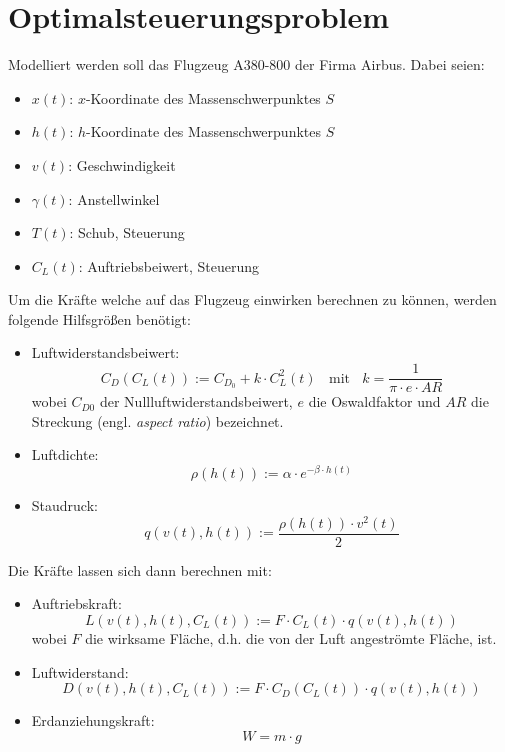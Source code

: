 \chapter{Optimalsteuerungsproblem} \label{cha:optim}

Modelliert werden soll das Flugzeug A380-800 der Firma Airbus. Dabei seien:
\begin{itemize}
    \item $x(t)$: $x$-Koordinate des Massenschwerpunktes $S$
    \item $h(t)$: $h$-Koordinate des Massenschwerpunktes $S$
    \item $v(t)$: Geschwindigkeit
    \item $\gamma(t)$: Anstellwinkel
    \item $T(t)$: Schub, Steuerung
    \item $C_L(t)$: Auftriebsbeiwert, Steuerung
\end{itemize}
Um die Kräfte welche auf das Flugzeug einwirken berechnen zu können, werden folgende Hilfsgrößen benötigt:
\begin{itemize}
    \item Luftwiderstandsbeiwert: \[C_D(C_L(t)) := C_{D_0} + k \cdot C^2_L(t) \ \ \ \ \text{mit} \ \ \ \ k = \dfrac{1}{\pi \cdot e \cdot AR}\] wobei $C_{D0}$ der Nullluftwiderstandsbeiwert, $e$ die Oswaldfaktor und $AR$ die Streckung (engl. \textit{aspect ratio}) bezeichnet.
    \item Luftdichte: \[\rho(h(t)) := \alpha \cdot e^{-\beta \cdot h(t)}\] %
    \item Staudruck: \[q(v(t), h(t)) := \dfrac{\rho(h(t)) \cdot v^2(t)}{2} \]
\end{itemize}
Die Kräfte lassen sich dann berechnen mit:
\begin{itemize}
    \item Auftriebskraft: \[L(v(t), h(t), C_L(t)) := F \cdot C_L(t) \cdot q(v(t), h(t))\] wobei $F$ die wirksame Fläche, d.h. die von der Luft angeströmte Fläche, ist.
    \item Luftwiderstand: \[D(v(t), h(t), C_L(t)) := F \cdot C_D(C_L(t)) \cdot q(v(t), h(t))\]
    \item Erdanziehungskraft: \[W = m \cdot g\]
\end{itemize}

